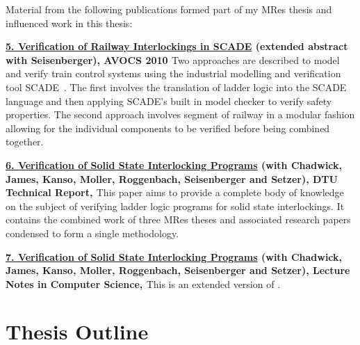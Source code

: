Material from the following publications formed part of my MRes thesis and influenced work in this thesis:

\textbf{\ul{5. Verification of Railway Interlockings in SCADE} (extended abstract with Seisenberger), AVOCS 2010 \cite{AL10}} 
Two approaches are described to model and verify train control systems using the industrial modelling and verification tool SCADE~\cite{Scade}. The first involves the translation of ladder logic into the SCADE language and then applying SCADE's built in model checker to verify safety properties. The second approach involves segment of railway in a modular fashion allowing for the individual components to be verified before being combined together.


\textbf{\ul{6. Verification of Solid State Interlocking Programs} (with Chadwick, James, Kanso, Moller, Roggenbach, Seisenberger and Setzer), DTU Technical Report, \cite{AL13}}
This paper aims to provide a complete body of knowledge on the subject of verifying ladder logic programs for solid state interlockings. It contains the combined work of three MRes theses and associated research papers condensed to form a single methodology.

\textbf{\ul{7. Verification of Solid State Interlocking Programs} (with Chadwick, James, Kanso, Moller, Roggenbach, Seisenberger and Setzer), Lecture Notes in Computer Science, \cite{AL14a}}
This is an extended version of \cite{AL13}.

\section{Thesis Outline}

